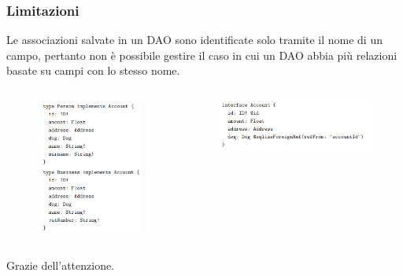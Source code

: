 \documentclass[c]{beamer}
\begin{document}
        \begin{frame}
            \frametitle{Limitazioni}
            Le associazioni salvate in un DAO sono identificate solo tramite il nome di un campo, 
            pertanto non è possibile gestire il caso in cui un DAO abbia più relazioni basate su campi con lo stesso nome.
            \begin{columns}[T]
                \begin{figure}
                    \includegraphics[scale=0.6]{Limits_Types.png}
                \end{figure}
                \begin{figure}
                    \includegraphics[scale=0.6]{Limits_Interface.png}
                \end{figure}
            \end{columns}
        \end{frame}

        \begin{frame}[plain,c]
            \begin{center}
                \huge Grazie dell'attenzione.
            \end{center}
        \end{frame}
\end{document}
